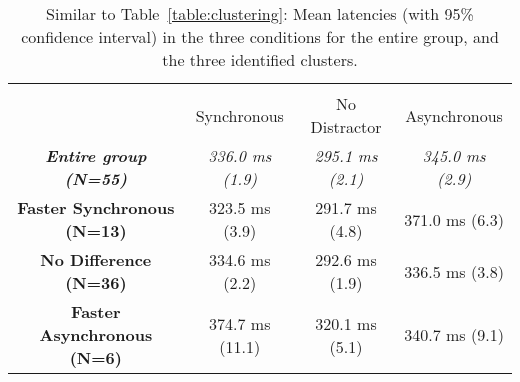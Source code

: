 \begin{table}[ht]
\caption{Similar to Table~\ref{table:clustering}: Mean latencies (with
  95\% confidence interval) in the three conditions for the entire group, and the three
  identified clusters.}  \centering
\begin{tabular}{c c c c}
\hline
\raisebox{-3ex}{\textbf{Group}} & \multicolumn{3}{c}{\raisebox{-1ex}{\textbf{Latencies for conditions}}} \\ [1ex]
 & Synchronous & No Distractor & Asynchronous \\ [1ex]
\hline
\textbf{\emph{Entire group (N=55)}} & \emph{ 336.0 ms (1.9)} & \emph{295.1 ms (2.1)} &  \emph{345.0 ms (2.9)} \\
\textbf{Faster Synchronous (N=13)}  &        323.5 ms (3.9) &       291.7 ms (4.8) &        371.0 ms (6.3) \\
\textbf{No Difference (N=36)}       &        334.6 ms (2.2) &       292.6 ms (1.9) &        336.5 ms (3.8) \\
\textbf{Faster Asynchronous (N=6)} &        374.7 ms (11.1) &       320.1 ms (5.1) &        340.7 ms (9.1) \\ [1ex]
\hline
\end{tabular}
\label{table:clustering_latencies}
\end{table}
